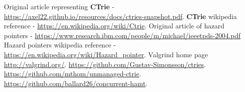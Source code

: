 \documentclass[dvips,12pt]{article}
\begin{document}
	\begin{thebibliography}{99}
		 Original article representing \textbf{CTrie} - \url{https://axel22.github.io/resources/docs/ctries-snapshot.pdf}. 
		 \textbf{CTrie} wikipedia reference - \url{https://en.wikipedia.org/wiki/Ctrie}.
		 Original article of hazard pointers - 
		\url{https://www.research.ibm.com/people/m/michael/ieeetpds-2004.pdf}
		 Hazard pointers wikipedia reference - \url{https://en.wikipedia.org/wiki/Hazard_pointer}.
		 Valgrind home page \url{http://valgrind.org/}.
		 \url{https://github.com/Gustav-Simonsson/ctries}.
		 \url{https://github.com/mthom/unmanaged-ctrie}.
		 \url{https://github.com/ballard26/concurrent-hamt}.
		
	\end{thebibliography}
	
	
	
\end{document}
